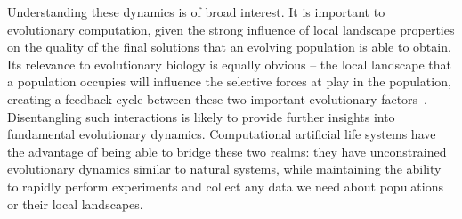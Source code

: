 \documentclass[10pt,letterpaper]{article}
\begin{document}
Understanding these dynamics is of broad interest. It is important to evolutionary computation, given the strong influence of local landscape properties on the quality of the final solutions that an evolving population is able to obtain. Its relevance to evolutionary biology is equally obvious -- the local landscape that a population occupies will influence the selective forces at play in the population, creating a feedback cycle between these two important evolutionary factors~\cite{zaman_coevolution_2014,meyer_repeatability_2012,martin_fitness_2006,kvitek_reciprocal_2011}. Disentangling such interactions is likely to provide further insights into fundamental evolutionary dynamics. Computational artificial life systems have the advantage of being able to bridge these two realms: they have unconstrained evolutionary dynamics similar to natural systems, while maintaining the ability to rapidly perform experiments and collect any data we need about populations or their local landscapes.
%
%
%
%
%
%
\end{document}
